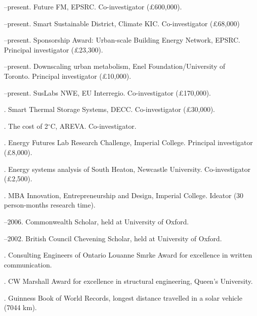 \documentclass[11pt,a4paper]{article}
\begin{document}
\noindent{}%

\bigskip

\noindent{}%
%

--present.  Future FM, EPSRC.  Co-investigator (£600,000).

--present.  Smart Sustainable District, Climate KIC.  Co-investigator (£68,000)

--present.  Sponsorship Award: Urban-scale Building Energy Network, EPSRC.  Principal investigator (£23,300).

--present. Downscaling urban metabolism, Enel Foundation/University of Toronto. Principal investigator (£10,000).

--present.  SusLabs NWE, EU Interregio.  Co-investigator (£170,000).

. Smart Thermal Storage Systems, DECC.  Co-investigator (£30,000).

. The cost of 2$^\circ$C, AREVA.  Co-investigator.

. Energy Futures Lab Research Challenge, Imperial College.  Principal investigator (£8,000).

. Energy systems analysis of South Heaton, Newcastle University.  Co-investigator (£2,500).

. MBA Innovation, Entrepreneurship and Design, Imperial College.  Ideator (30 person-months research time).

--2006.  Commonwealth Scholar, held at University of Oxford.

--2002.  British Council Chevening Scholar, held at University of Oxford.

.  Consulting Engineers of Ontario Louanne Smrke Award for excellence in written communication.

. CW Marshall Award for excellence in structural engineering, Queen's University.

. Guinness Book of World Records, longest distance travelled in a solar vehicle (7044 km).
\end{document}
